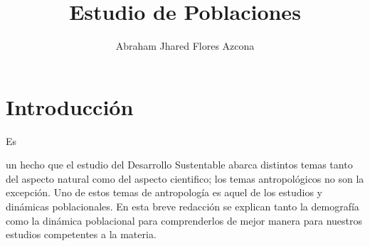\documentclass[stu, 12pt, letterpaper, donotrepeattitle, floatsintext, natbib]{apa7}
\title{\Large Estudio de Poblaciones}
\author{Abraham Jhared Flores Azcona} %
\affiliation{Instituto Tecnológico de Tijuana}
\begin{document}
\maketitle


\renewcommand\contentsname{Contenido}
\tableofcontents

\newpage
\section*{Introducción}
Es \begin{justifying}
    un hecho que el estudio del Desarrollo Sustentable abarca distintos temas tanto del aspecto natural como del aspecto cientifico; los temas
    antropológicos no son la excepción. Uno de estos temas de antropología es aquel de los estudios y dinámicas poblacionales. En esta breve redacción se
    explican tanto la demografía como la dinámica poblacional para comprenderlos de mejor manera para nuestros estudios competentes a la materia.\par
\end{justifying}
\vspace{\baselineskip}
\end{document}
